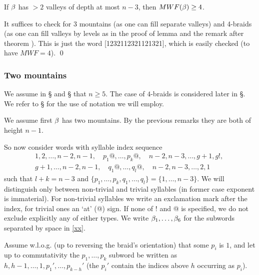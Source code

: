 \begin{lemma}\label{lem2val}
If $\beta$ has $>2$ valleys of depth at most $n-3$, then $MWF(\beta)\ge 4$.
\end{lemma}

\proof %
It suffices to check for 3 mountains (as one can fill
separate valleys) and 4-braids (as one can fill valleys by
levels as in the proof of lemma  and the remark
after theorem ). This is just
the word [1232112321121321], which is easily checked (to
have $MWF=4$). \qed

\subsubsection{Two mountains\label{S4.1}}

We assume in \S{} and \S{} that $n\ge 5$.
The case of $4$-braids is considered later in \S{}.
We refer to \S{} for the use of notation we will employ.

We assume first $\beta$ has two mountains. By the previous remarks they
are both of height $n-1$.

So now consider words with syllable index sequence
\begin{eqnarray}\nonumber
& 1,2,\dots,n-2,n-1,\quad
p_1@,\dots,p_k@,\quad
n-2,n-3,\dots,g+1,g!,\quad \\
\label{xx} &
g+1,\dots,n-2,n-1,\quad
q_1@,\dots,q_l@,\quad
n-2,n-3,\dots,2,1
\end{eqnarray}
such that $l+k=n-3$ and
$\{p_1,\dots,p_k,q_1,\dots,q_l\}=\{1,\dots,n-3\}$.
We will distinguish only between non-trivial and trivial syllables
(in former case exponent is immaterial). For non-trivial syllables
we write an exclamation mark
after the index, for trivial ones an `at' (@) sign.
If none of $!$ and @ is specified, we do not exclude explicitly any of
either types. We write $\beta_1,\dots,\beta_6$ for the subwords separated by
space in \eqref{xx}.

Assume w.l.o.g. (up to reversing the braid's orientation) that
some $p_i$ is $1$, and let up to commutativity the $p_1,\dots,p_k$
subword be written as $h,h-1,\dots,1,p_1',\dots,p_{k-h}'$ (the 
$p_i'$ contain the indices above $h$ occurring as $p_i$).

